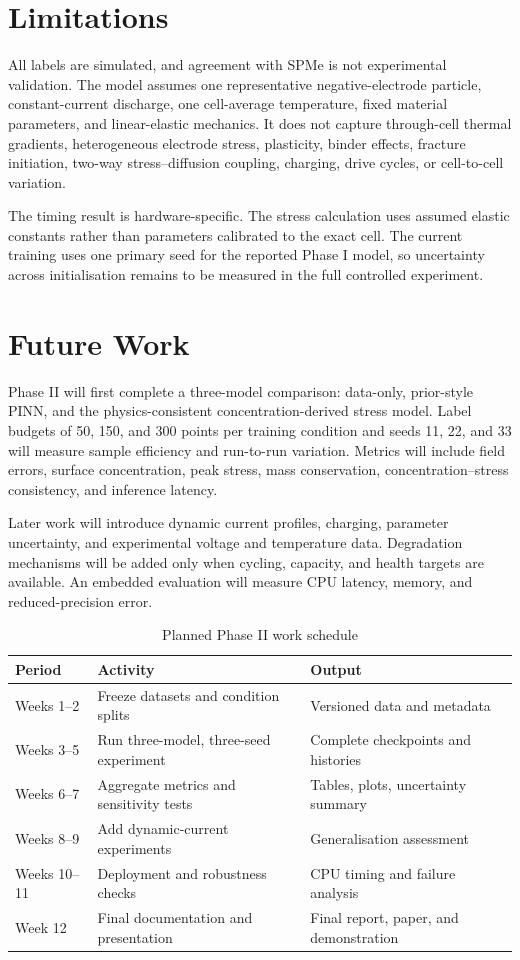 \documentclass[14pt,a4paper,oneside]{extreport}
\begin{document}
\section{Limitations}
All labels are simulated, and agreement with SPMe is not experimental validation. The model assumes one representative negative-electrode particle, constant-current discharge, one cell-average temperature, fixed material parameters, and linear-elastic mechanics. It does not capture through-cell thermal gradients, heterogeneous electrode stress, plasticity, binder effects, fracture initiation, two-way stress--diffusion coupling, charging, drive cycles, or cell-to-cell variation.

The timing result is hardware-specific. The stress calculation uses assumed elastic constants rather than parameters calibrated to the exact cell. The current training uses one primary seed for the reported Phase I model, so uncertainty across initialisation remains to be measured in the full controlled experiment.

\section{Future Work}
\label{sec:conclusion-last}
Phase II will first complete a three-model comparison: data-only, prior-style PINN, and the physics-consistent concentration-derived stress model. Label budgets of 50, 150, and 300 points per training condition and seeds 11, 22, and 33 will measure sample efficiency and run-to-run variation. Metrics will include field errors, surface concentration, peak stress, mass conservation, concentration--stress consistency, and inference latency.

Later work will introduce dynamic current profiles, charging, parameter uncertainty, and experimental voltage and temperature data. Degradation mechanisms will be added only when cycling, capacity, and health targets are available. An embedded evaluation will measure CPU latency, memory, and reduced-precision error.

\begin{table}[htbp]
\centering
\caption{Planned Phase II work schedule}
\small
\begin{tabularx}{\textwidth}{p{}p{}X}
\toprule
Period & Activity & Output\\
\midrule
Weeks 1--2 & Freeze datasets and condition splits & Versioned data and metadata\\
Weeks 3--5 & Run three-model, three-seed experiment & Complete checkpoints and histories\\
Weeks 6--7 & Aggregate metrics and sensitivity tests & Tables, plots, uncertainty summary\\
Weeks 8--9 & Add dynamic-current experiments & Generalisation assessment\\
Weeks 10--11 & Deployment and robustness checks & CPU timing and failure analysis\\
Week 12 & Final documentation and presentation & Final report, paper, and demonstration\\
\bottomrule
\end{tabularx}
\end{table}
\end{document}
